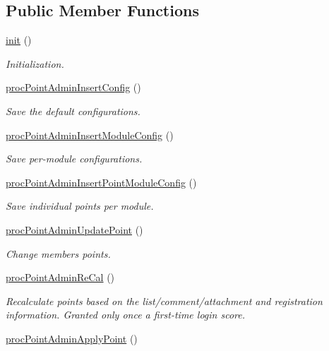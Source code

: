 \subsection*{Public Member Functions}
\begin{DoxyCompactItemize}
\item 
\hyperlink{classpointAdminController_a739b139aeeef70cf164f5e21dccec06a}{init} ()
\begin{DoxyCompactList}\small\item\em Initialization. \end{DoxyCompactList}\item 
\hyperlink{classpointAdminController_a57b75694a363d0c8dc6d46ffce1ce25d}{proc\-Point\-Admin\-Insert\-Config} ()
\begin{DoxyCompactList}\small\item\em Save the default configurations. \end{DoxyCompactList}\item 
\hyperlink{classpointAdminController_a8358535932ea77e28e3510b4f42d1083}{proc\-Point\-Admin\-Insert\-Module\-Config} ()
\begin{DoxyCompactList}\small\item\em Save per-\/module configurations. \end{DoxyCompactList}\item 
\hyperlink{classpointAdminController_a54aeea5eae9769da55bd85159a41501a}{proc\-Point\-Admin\-Insert\-Point\-Module\-Config} ()
\begin{DoxyCompactList}\small\item\em Save individual points per module. \end{DoxyCompactList}\item 
\hyperlink{classpointAdminController_a2d90c166719dee56dbee47b7aa5eb30d}{proc\-Point\-Admin\-Update\-Point} ()
\begin{DoxyCompactList}\small\item\em Change members points. \end{DoxyCompactList}\item 
\hyperlink{classpointAdminController_a0932223bc8b3441dcfff013c6050ee89}{proc\-Point\-Admin\-Re\-Cal} ()
\begin{DoxyCompactList}\small\item\em Recalculate points based on the list/comment/attachment and registration information. Granted only once a first-\/time login score. \end{DoxyCompactList}\item 
\hyperlink{classpointAdminController_ade85d4289b954ca0c0caadafeb4c115c}{proc\-Point\-Admin\-Apply\-Point} ()

\end{DoxyCompactItemize}
